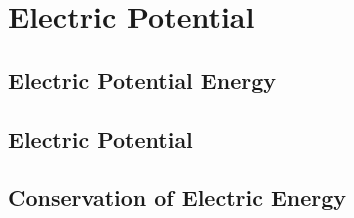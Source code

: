 \documentclass[../em.tex]{subfiles}
\begin{document}
\chapter{Electric Potential}
\section{Electric Potential Energy}
\section{Electric Potential}
\section{Conservation of Electric Energy}
\end{document}
